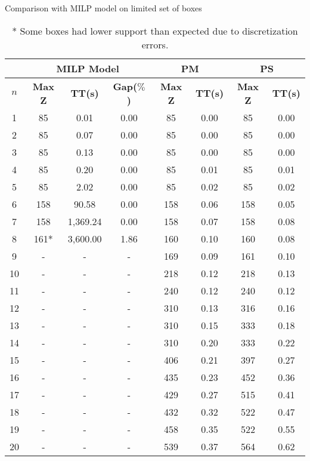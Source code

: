 \begin{table}[htbp]
    \centering
    \caption{Comparison with MILP model on limited set of boxes}
    \begin{tabular}{|c|c|c|c|c|c|c|c|}
    \hline
    & \multicolumn{ 3}{c|}{\textbf{MILP Model}} & \multicolumn{ 2}{c|}{\textbf{PM}} & \multicolumn{ 2}{c|}{\textbf{PS}} \\ \hline
    \textbf{$n$} & \textbf{Max Z} & \textbf{TT(s)} & \textbf{Gap($\%$)} & \textbf{Max Z} & \textbf{TT(s)} & \textbf{Max Z} & \textbf{TT(s)} \\ \hline
    1  & 85   & 0.01     & 0.00 & 85  & 0.00 & 85  & 0.00 \\ 
    2  & 85   & 0.07     & 0.00 & 85  & 0.00 & 85  & 0.00 \\ 
    3  & 85   & 0.13     & 0.00 & 85  & 0.00 & 85  & 0.00 \\ 
    4  & 85   & 0.20     & 0.00 & 85  & 0.01 & 85  & 0.01 \\ 
    5  & 85   & 2.02     & 0.00 & 85  & 0.02 & 85  & 0.02 \\ 
    6  & 158  & 90.58    & 0.00 & 158 & 0.06 & 158 & 0.05 \\ 
    7  & 158  & 1,369.24 & 0.00 & 158 & 0.07 & 158 & 0.08 \\ 
    8  & 161* & 3,600.00 & 1.86 & 160 & 0.10 & 160 & 0.08 \\ \hline
    9  & -    & -        & -    & 169 & 0.09 & 161 & 0.10 \\ 
    10 & -    & -        & -    & 218 & 0.12 & 218 & 0.13 \\ 
    11 & -    & -        & -    & 240 & 0.12 & 240 & 0.12 \\ 
    12 & -    & -        & -    & 310 & 0.13 & 316 & 0.16 \\ 
    13 & -    & -        & -    & 310 & 0.15 & 333 & 0.18 \\ 
    14 & -    & -        & -    & 310 & 0.20 & 333 & 0.22 \\ 
    15 & -    & -        & -    & 406 & 0.21 & 397 & 0.27 \\ 
    16 & -    & -        & -    & 435 & 0.23 & 452 & 0.36 \\ 
    17 & -    & -        & -    & 429 & 0.27 & 515 & 0.41 \\ 
    18 & -    & -        & -    & 432 & 0.32 & 522 & 0.47 \\ 
    19 & -    & -        & -    & 458 & 0.35 & 522 & 0.55 \\ 
    20 & -    & -        & -    & 539 & 0.37 & 564 & 0.62 \\ \hline
    \end{tabular}
    \label{exp:model}
    \caption*{* Some boxes had lower support than expected due to discretization errors.}
    \end{table}
